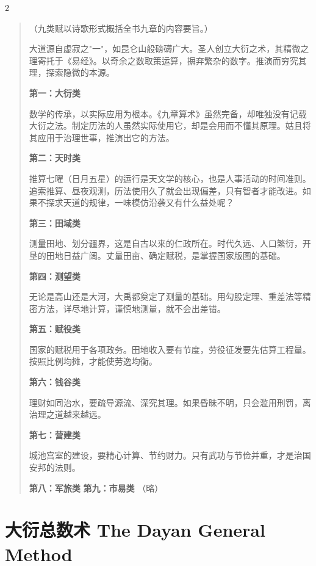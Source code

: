 \documentclass[11pt,a4paper]{article}
\newcommand{\zhtext}[1]{{\chinese #1}}
\begin{document}
\begin{paracol}{2}
\begin{quote}\small\color{prefacecolor}
（九类赋以诗歌形式概括全书九章的内容要旨。）

大道源自虚寂之"一"，如昆仑山般磅礴广大。圣人创立大衍之术，其精微之理寄托于《易经》。以奇余之数取策运算，摒弃繁杂的数字。推演而穷究其理，探索隐微的本源。

\textbf{第一：大衍类}

数学的传承，以实际应用为根本。《九章算术》虽然完备，却唯独没有记载大衍之法。制定历法的人虽然实际使用它，却是会用而不懂其原理。姑且将其应用于治理世事，推演出它的方法。

\textbf{第二：天时类}

推算七曜（日月五星）的运行是天文学的核心，也是人事活动的时间准则。追索推算、昼夜观测，历法使用久了就会出现偏差，只有智者才能改进。如果不探求天道的规律，一味模仿沿袭又有什么益处呢？

\textbf{第三：田域类}

测量田地、划分疆界，这是自古以来的仁政所在。时代久远、人口繁衍，开垦的田地日益广阔。丈量田亩、确定赋税，是掌握国家版图的基础。

\textbf{第四：测望类}

无论是高山还是大河，大禹都奠定了测量的基础。用勾股定理、重差法等精密方法，详尽地计算，谨慎地测量，就不会出差错。

\textbf{第五：赋役类}

国家的赋税用于各项政务。田地收入要有节度，劳役征发要先估算工程量。按照比例均摊，才能使劳逸均衡。

\textbf{第六：钱谷类}

理财如同治水，要疏导源流、深究其理。如果昏昧不明，只会滥用刑罚，离治理之道越来越远。

\textbf{第七：营建类}

城池宫室的建设，要精心计算、节约财力。只有武功与节俭并重，才是治国安邦的法则。

\textbf{第八：军旅类}
\textbf{第九：市易类}
（略）
\end{quote}

\end{paracol}

\newpage

\section{\zhtext{大衍总数术} The Dayan General Method}
\end{document}
